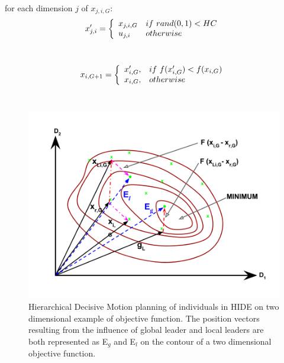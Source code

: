 \documentclass[a4paper,twoside]{article}
\begin{document}
for each dimension $j$ of $x_{j,i,G}$:
\begin{equation}
x'_{j,i} =  
\left\{
\begin{array}{ll}
      x_{j,i,G} & if \thinspace\thinspace rand(0,1) < HC \\
      u_{j,i} & otherwise \\
\end{array} 
\right. 
\end{equation}\\
\vspace{-5.5mm}

\vspace{-1.5mm}
\begin{equation}
x_{i,G+1} =  
\left\{
\begin{array}{ll}
      x'_{i,G}, & if \thinspace\thinspace f(x'_{i,G}) < f(x_{i,G}) \\
      x_{i,G}, & otherwise \\
\end{array} 
\right. 
\end{equation}\\
\vspace{-2mm}


\begin{figure}[h!]
  \includegraphics[scale=0.25]{contourDL}
  \caption{Hierarchical Decisive Motion planning of individuals in HIDE on two dimensional example of objective function. The position vectors resulting from the influence of global leader and local leaders are both represented
as E$_{g}$ and E$_{l}$ on the contour of a two dimensional objective function.}
  \label{fig:contourDL}
\end{figure}
\end{document}
